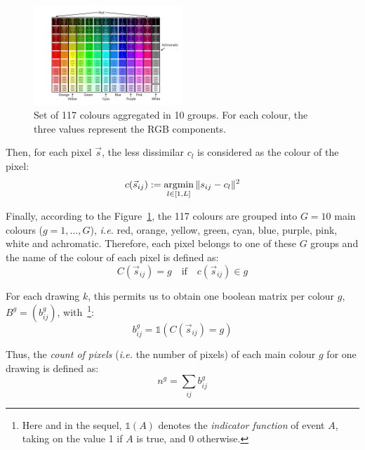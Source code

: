 \documentclass[11pt,a4paper]{article}
\begin{document}
\begin{figure}
	\centering
	\includegraphics[width=0.5\textwidth]{figures/Col_tab.pdf}
	\caption{Set of 117 colours aggregated in 10 groups. For each colour, the three values represent the RGB components. \label{fig:colour_set}}
\end{figure}

Then, for each pixel \(\vec{s}\), the less dissimilar \(c_l\) is considered as
the colour of the pixel:
\begin{equation*}
c(\vec{s}_{ij}) := \operatornamewithlimits{argmin}_{l \in [1,L]} \| s_{ij} - c_{l} \|^{2}
\end{equation*}



Finally, according to the Figure~\ref{fig:colour_set}, the 117 colours are grouped into $G = 10$
main colours ($g = 1, \dots, G$), \textit{i.e.} red, orange, yellow, green, cyan, blue, purple, pink,
white and achromatic. Therefore, each pixel belongs to one of these
$G$ groups and the name of the colour of each pixel is defined as: 
{\color{red}
	\begin{equation*}
	C(\vec{s}_{ij}) = g \quad \textrm{if} \quad c(\vec{s}_{ij}) \in g
	\end{equation*}
}

For each drawing $k$, this permits us to obtain one
boolean matrix per colour $g$, $B^{g} = (b_{ij}^{g})$, with~\footnote{Here and in the sequel, $\mathds{1}(A)$ denotes the \textit{indicator function} of event $A$, taking on the value 1 if $A$ is true, and 0 otherwise.}:
\begin{equation}
	b_{ij}^{g} =  \mathds{1}(C(\vec{s}_{ij}) = g)
\end{equation}

Thus, the \textit{count of pixels}  (\textit{i.e.} the number of pixels) of each main colour $g$ for one drawing is defined as:
\begin{equation}
	n^{g} = \sum_{ij}b_{ij}^{g}
\end{equation}
\end{document}
